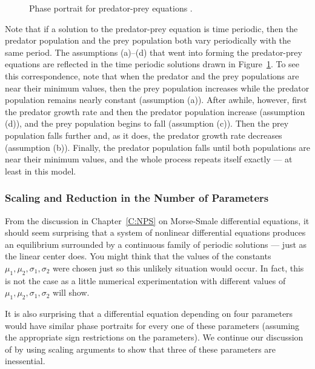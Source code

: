 \begin{figure}[htb]
           \centerline{%
	   }
           \caption{Phase portrait for predator-prey equations 
		\protect{}.}
           \label{F:PP1}
\end{figure}

Note that if a solution to the predator-prey equation is time periodic, then 
the predator population and the prey population both vary periodically with 
the same period.  The assumptions (a)--(d) that went into forming the
predator-prey equations  are reflected in the time periodic 
solutions drawn in Figure~\ref{F:PP1}.  To see this correspondence, note that 
when the predator and the prey populations are near their minimum values, then 
the prey population increases while the predator population remains nearly 
constant (assumption (a)).  After awhile, however, first the predator growth
rate and then the predator population increase (assumption (d)), and the prey 
population begins to fall (assumption (c)).  Then the prey population falls 
further and, as it does, the predator growth rate decreases (assumption (b)). 
Finally, the predator population falls until both populations are near their 
minimum values, and the whole process repeats itself exactly --- at least in
this model.  

\subsubsection*{Scaling and Reduction in the Number of Parameters}

From the discussion in Chapter~\ref{C:NPS} on Morse-Smale differential
equations, it should seem surprising that a system of nonlinear differential 
equations produces an equilibrium surrounded by a continuous family of 
periodic solutions --- just as the linear center does.  You 
might think that the values of the constants $\mu_1,\mu_2,\sigma_1,\sigma_2$ 
were chosen just so this unlikely situation would occur.  In fact, this is 
not the case as a little numerical experimentation with different values of 
$\mu_1,\mu_2,\sigma_1,\sigma_2$ will show.  

It is also surprising that a differential equation depending on four
parameters would have similar phase portraits for every one of
these parameters (assuming the appropriate sign restrictions on
the parameters).  We continue our discussion of  by using scaling
arguments to show that three of these parameters are inessential.  

